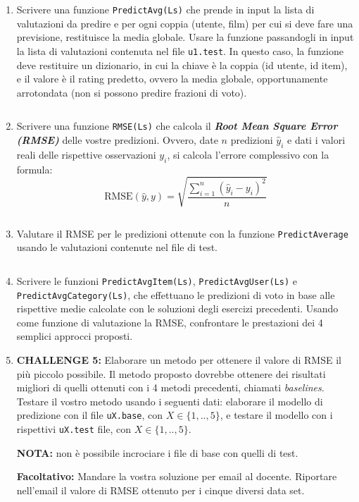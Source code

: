 \documentclass[11pt,a4]{article}
\newcommand{\mybox}[2]{$\quad$\fbox{
\begin{minipage}{#1cm}
\hfill\vspace{#2cm}
\end{minipage}
}}
\begin{document}
\begin{enumerate}
\item Scrivere una funzione {\tt PredictAvg(Ls)} che prende in input la lista di valutazioni da predire
e per ogni coppia (utente, film) per cui si deve fare una previsione, restituisce la media globale.
Usare la funzione passandogli in input la lista di valutazioni contenuta nel file {\tt u1.test}.
In questo caso, la funzione deve restituire un dizionario, in cui la chiave è la coppia (id utente, id item), e il
valore è il rating predetto, ovvero la media globale, opportunamente arrotondata (non si possono predire frazioni di voto).

\mybox{15}{3}

\item Scrivere una funzione {\tt RMSE(Ls)} che calcola il {\bf {\it Root Mean Square Error (RMSE)}} delle vostre predizioni.
Ovvero, date $n$ predizioni $\hat{y}_i$ e dati i valori reali delle rispettive osservazioni $y_i$, si calcola l'errore complessivo con la formula:
$$
	\mbox{RMSE}(\hat{y}, y) = \sqrt{\frac{\sum_{i=1}^n (\hat{y}_i - y_i)^2}{n}}
$$

\mybox{15}{3}

\item Valutare il RMSE per le predizioni ottenute con la funzione {\tt PredictAverage} usando le valutazioni contenute nel file di test.

\mybox{15}{3}

\item Scrivere le funzioni {\tt PredictAvgItem(Ls)}, {\tt PredictAvgUser(Ls)} e {\tt PredictAvgCategory(Ls)}, che effettuano
le predizioni di voto in base alle rispettive medie calcolate con le soluzioni degli esercizi precedenti.
Usando come funzione di valutazione la RMSE, confrontare le prestazioni dei 4 semplici approcci proposti.

\item {\bf CHALLENGE 5:} Elaborare un metodo per ottenere il valore di RMSE il più piccolo possibile. Il metodo proposto
dovrebbe ottenere dei risultati migliori di quelli ottenuti con i 4 metodi precedenti, chiamati {\it baselines}.
Testare il vostro metodo usando i seguenti dati: elaborare il modello di predizione con il file {\tt uX.base}, con $X \in \{1,..,5\}$,
e testare il modello con i rispettivi {\tt uX.test} file, con $X \in \{1,..,5\}$. 

{\bf NOTA:} non è possibile incrociare i file di base con quelli di test.

{\bf Facoltativo:} Mandare la vostra soluzione per email al docente. Riportare nell'email il valore di RMSE ottenuto per i cinque diversi data set.


\end{enumerate}
\end{document}
